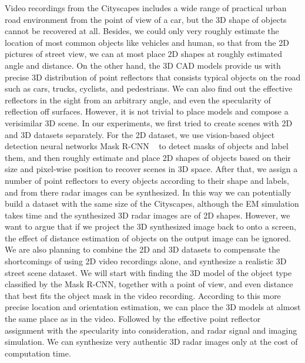 Video recordings from the Cityscapes includes a wide range of practical urban road environment from the point of view of a car, but the 3D shape of objects cannot be recovered at all. Besides, we could only very roughly estimate the location of most common objects like vehicles and human, so that from the 2D pictures of street view, we can at most place 2D shapes at roughly estimated angle and distance. On the other hand, the 3D CAD models provide us with precise 3D distribution of point reflectors that consists typical objects on the road such as cars, trucks, cyclists, and pedestrians. We can also find out the effective reflectors in the sight from an arbitrary angle, and even the specularity of reflection off surfaces. However, it is not trivial to place models and compose a verisimilar 3D scene. In our experiments, we first tried to create scenes with 2D and 3D datasets separately. For the 2D dataset, we use vision-based object detection neural networks Mask R-CNN ~\cite{rcnn} to detect masks of objects and label them, and then roughly estimate and place 2D shapes of objects based on their size and pixel-wise position to recover scenes in 3D space. After that, we assign a number of point reflectors to every objects according to their shape and labels, and from there radar images can be synthesized. In this way we can potentially build a dataset with the same size of the Cityscapes, although the EM simulation takes time and the synthesized 3D radar images are of 2D shapes. However, we want to argue that if we project the 3D synthesized image back to onto a screen, the effect of distance estimation of objects on the output image can be ignored. We are also planning to combine the 2D and 3D datasets to compensate the shortcomings of using 2D video recordings alone, and synthesize a realistic 3D street scene dataset. We will start with finding the 3D model of the object type classified by the Mask R-CNN, together with a point of view, and even distance that best fits the object mask in the video recording. According to this more precise location and orientation estimation, we can place the 3D models at almost the same place as in the video. Followed by the effective point reflector assignment with the specularity into consideration, and radar signal and imaging simulation. We can synthesize very authentic 3D radar images only at the cost of computation time.


		
	

